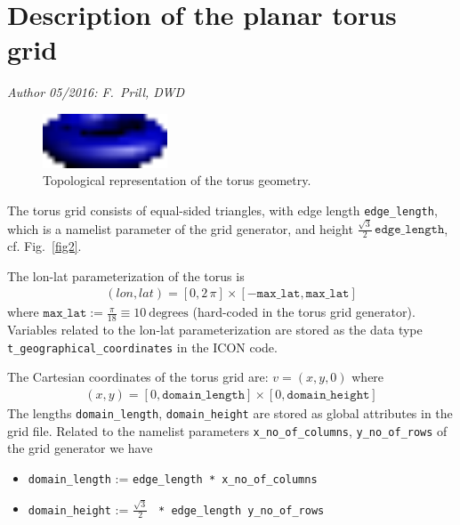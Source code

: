 \documentclass{article}
\begin{document}
\section*{Description of the planar torus grid}

\textit{Author 05/2016: F.\ Prill, DWD}

\begin{figure}[ht]
  \centering
  \includegraphics[width=0.33\textwidth]{torus.pdf}
  \caption{Topological representation of the torus geometry.}
  \label{fig1}
\end{figure}

The torus grid consists of equal-sided triangles, with edge length
\texttt{edge\_length}, which is a namelist parameter of the grid
generator, and height $\frac{\sqrt{3}}{2} \, \texttt{edge\_length}$,
cf. Fig.~\ref{fig2}.


The lon-lat parameterization of the torus is 
\begin{align*}
  (lon,lat) = [0, 2 \, \pi]  \times [- \texttt{max\_lat}, \texttt{max\_lat}]
\end{align*}
where $\texttt{max\_lat} := \frac{\pi}{18} \equiv 10~ \text{degrees}$
(hard-coded in the torus grid generator).  Variables related to the
lon-lat parameterization are stored as the data type
\texttt{t\_geographical\_coordinates} in the ICON code.

The Cartesian coordinates of the torus grid are: $v = (x,y,0)$
where
\begin{align*}
   (x,y) = [0,\texttt{domain\_length}] \times [0,\texttt{domain\_height}]
\end{align*}
The lengths \texttt{domain\_length}, \texttt{domain\_height} are
stored as global attributes in the grid file.  Related to the namelist
parameters \texttt{x\_no\_of\_columns}, \texttt{y\_no\_of\_rows}
of the grid generator we have
\begin{itemize}
 \item \texttt{domain\_length} := \texttt{edge\_length * x\_no\_of\_columns}
 \item \texttt{domain\_height} := $\frac{\sqrt{3}}{2}$ \texttt{ * edge\_length y\_no\_of\_rows}
\end{itemize}
\end{document}
